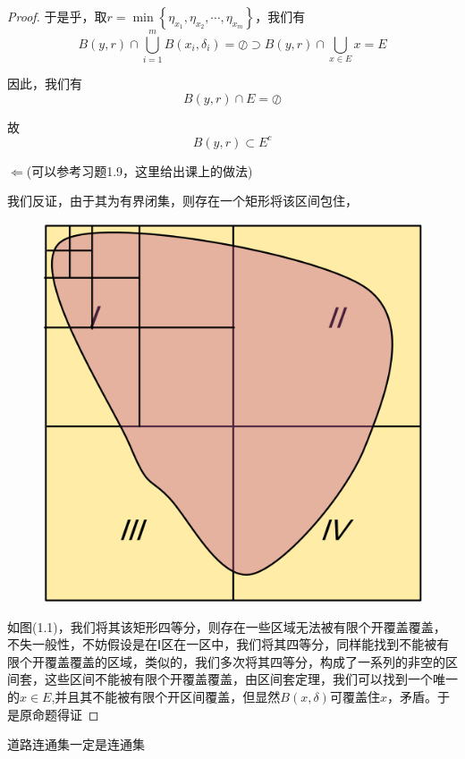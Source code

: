 \documentclass[lang=cn,10pt]{elegantbook}
\begin{document}
\begin{proof}
		于是乎，取$r=\min \left\{ \eta _{x_1},\eta _{x_2},\cdots ,\eta _{x_m} \right\} $，我们有
		\begin{equation*}
			B\left( y,r \right) \cap \bigcup_{i=1}^m{B\left( x_i,\delta _i \right)}=\oslash \supset B\left( y,r \right) \cap \bigcup_{x\in E}{x}=E
		\end{equation*}
		
		因此，我们有
		\begin{equation*}
			B\left( y,r \right) \cap E=\oslash
		\end{equation*}
		
		故
		\begin{equation*}
			B\left( y,r \right) \subset E^{c}
		\end{equation*}
		
		$\Leftarrow$(可以参考习题1.9，这里给出课上的做法)
		
		我们反证，由于其为有界闭集，则存在一个矩形将该区间包住，
		\begin{figure}[H]
			\centering
			\includegraphics[width=0.2\linewidth]{Untitled}
			\caption{}
			\label{fig:untitled}
		\end{figure}
		
		如图(1.1)，我们将其该矩形四等分，则存在一些区域无法被有限个开覆盖覆盖，不失一般性，不妨假设是在Ⅰ区在一区中，我们将其四等分，同样能找到不能被有限个开覆盖覆盖的区域，类似的，我们多次将其四等分，构成了一系列的非空的区间套，这些区间不能被有限个开覆盖覆盖，由区间套定理，我们可以找到一个唯一的$x\in E$,并且其不能被有限个开区间覆盖，但显然$B(x,\delta)$可覆盖住$x$，矛盾。于是原命题得证
	\end{proof}
	\begin{theorem}
		道路连通集一定是连通集
	\end{theorem}
\end{document}
